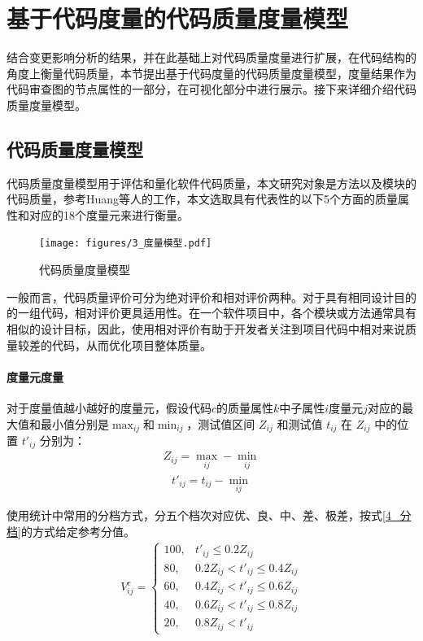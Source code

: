 \section{基于代码度量的代码质量度量模型}

结合变更影响分析的结果，并在此基础上对代码质量度量进行扩展，在代码结构的角度上衡量代码质量，本节提出基于代码度量的代码质量度量模型，度量结果作为代码审查图的节点属性的一部分，在可视化部分中进行展示。接下来详细介绍代码质量度量模型。

\subsection{代码质量度量模型}
\label{3_代码质量度量模型}


代码质量度量模型用于评估和量化软件代码质量，本文研究对象是方法以及模块的代码质量，参考Huang等人的工作\cite{黄沛杰2011代码质量静态度量的研究与应用}，本文选取具有代表性的以下5个方面的质量属性和对应的18个度量元来进行衡量。

\begin{figure}[h]
\centering
\texttt{[image: figures/3\_度量模型.pdf]}
\caption{代码质量度量模型}
\end{figure}

一般而言，代码质量评价可分为绝对评价和相对评价两种。对于具有相同设计目的的一组代码，相对评价更具适用性\cite{黄沛杰2011代码质量静态度量的研究与应用}。在一个软件项目中，各个模块或方法通常具有相似的设计目标，因此，使用相对评价有助于开发者关注到项目代码中相对来说质量较差的代码，从而优化项目整体质量。

\paragraph{度量元度量} 对于度量值越小越好的度量元，假设代码$c$的质量属性$k$中子属性$i$度量元$j$对应的最大值和最小值分别是$\max_{ij}$和$\min_{ij}$，测试值区间 \(Z_{ij}\) 和测试值 \(t_{ij}\) 在 \(Z_{ij}\) 中的位置 \(t'_{ij}\) 分别为：
\begin{align}
Z_{ij} = \max_{ij} - \min_{ij}
\end{align}
\begin{align}
t'_{ij} = t_{ij} - \min_{ij}
\end{align}

使用统计中常用的分档方式，分五个档次对应优、良、中、差、极差，按式\ref{4_分档}的方式给定参考分值。
\begin{align}
\label{4_分档}
V_{ij}^c = 
\begin{cases} 
100, & t'_{ij} \leq 0.2Z_{ij} \\ 
80, & 0.2Z_{ij} < t'_{ij} \leq 0.4Z_{ij} \\ 
60, & 0.4Z_{ij} < t'_{ij} \leq 0.6Z_{ij} \\ 
40, & 0.6Z_{ij} < t'_{ij} \leq 0.8Z_{ij} \\ 
20, & 0.8Z_{ij} < t'_{ij}
\end{cases}
\end{align}

